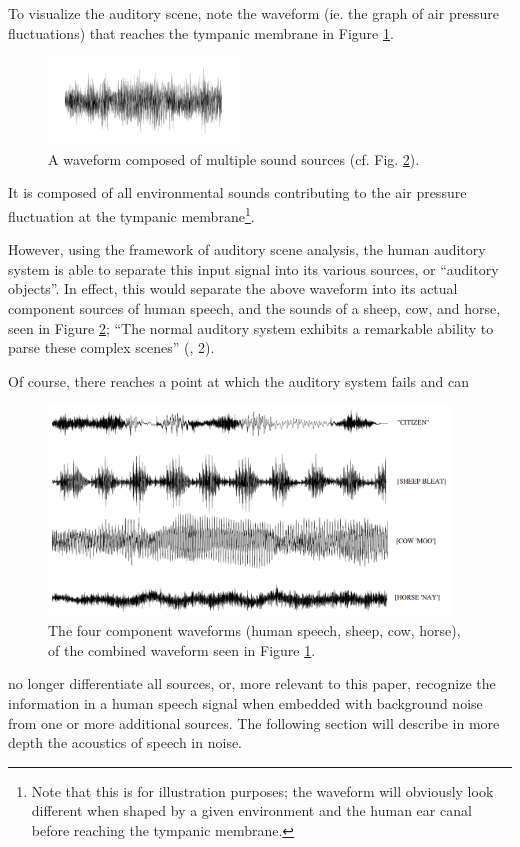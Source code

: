 \documentclass[dissertation,copyright]{uathesis}
\begin{document}
To visualize the auditory scene, note the waveform (ie. the graph of air pressure fluctuations) that reaches the tympanic membrane in Figure \ref{fig:animal_singlechannel}.  
%
\begin{figure}
\centering
  \includegraphics[width=0.45\textwidth]{figure/single-channel-animals.png}
  \caption{A waveform composed of multiple sound sources (cf. Fig. \ref{fig:animal_multichannel}).}
  \label{fig:animal_singlechannel}
\end{figure}
%
It is composed of all environmental sounds contributing to the air pressure fluctuation at the tympanic membrane\footnote{Note that this is for illustration purposes; the waveform will obviously look different when shaped by a given environment and the human ear canal before reaching the tympanic membrane.}.

However, using the framework of auditory scene analysis, the human auditory system is able to separate this input signal into its various sources, or ``auditory objects''.  In effect, this would separate the above waveform into its actual component sources of human speech, and the sounds of a sheep, cow, and horse, seen in Figure \ref{fig:animal_multichannel}; ``The normal auditory system exhibits a remarkable ability to parse these complex scenes'' (\cite{middlebrooks:17}, 2).

Of course, there reaches a point at which the auditory system fails and can
%
\begin{figure}[h]
\centering
  \includegraphics[width=0.95\textwidth]{figure/multi-channel-animals_w-text.png}
  \caption{The four component waveforms (human speech, sheep, cow, horse), of the combined waveform seen in Figure \ref{fig:animal_singlechannel}.}
  \label{fig:animal_multichannel}
\end{figure}
%
 no longer differentiate all sources, or, more relevant to this paper, recognize the information in a human speech signal when embedded with background noise from one or more additional sources.  The following section will describe in more depth the acoustics of speech in noise.
  
\end{document}
